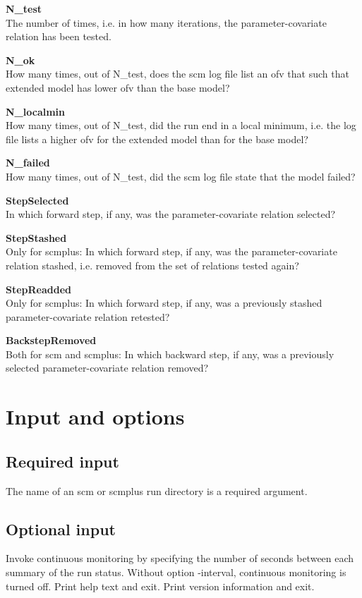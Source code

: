 {\bfseries N\_test}\\
The number of times, i.e. in how many iterations, 
the parameter-covariate relation has been tested.

{\bfseries N\_ok}\\
How many times, out of N\_test, does the scm log file list an ofv that such that extended model
has lower ofv than the base model?

{\bfseries N\_localmin}\\
How many times, out of N\_test, did the run end in a local minimum, i.e. the log file lists a
higher ofv for the extended model than for the base model?

{\bfseries N\_failed}\\
How many times, out of N\_test, did the scm log file state that the model failed?

{\bfseries StepSelected} \\
In which forward step, if any, was the parameter-covariate relation selected?

{\bfseries StepStashed} \\
Only for scmplus: In which forward step, if any, was the parameter-covariate relation stashed, i.e. removed from the set of relations tested again?

{\bfseries StepReadded} \\
Only for scmplus: In which forward step, if any, was a previously stashed
parameter-covariate relation retested?

{\bfseries BackstepRemoved}\\ 
Both for scm and scmplus: 
In which backward step, if any, was a previously selected parameter-covariate relation removed?

\section{Input and options}

\subsection{Required input}
The name of an scm or scmplus run directory is a required argument.

\subsection{Optional input}

\begin{optionlist}
Invoke continuous monitoring by specifying the number of seconds
between each summary of the run status.
Without option -interval, continuous monitoring is turned off.
\nextopt
{}
Print help text and exit.
\nextopt
{}
Print version information and exit.
\end{optionlist}




